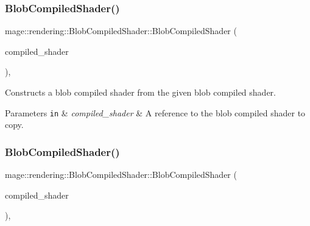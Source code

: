 \subsubsection{\texorpdfstring{Blob\+Compiled\+Shader()}{BlobCompiledShader()}\hspace{0.1cm}{\footnotesize\ttfamily [2/3]}}
{\footnotesize\ttfamily mage\+::rendering\+::\+Blob\+Compiled\+Shader\+::\+Blob\+Compiled\+Shader (\begin{DoxyParamCaption}\item[{const \mbox{\hyperlink{classmage_1_1rendering_1_1_blob_compiled_shader}{Blob\+Compiled\+Shader}} \&}]{compiled\+\_\+shader }\end{DoxyParamCaption})\hspace{0.3cm}{\ttfamily [default]}, {\ttfamily [noexcept]}}

Constructs a blob compiled shader from the given blob compiled shader.


\begin{DoxyParams}[1]{Parameters}
\mbox{\tt in}  & {\em compiled\+\_\+shader} & A reference to the blob compiled shader to copy. \\
\hline
\end{DoxyParams}
\mbox{\label{classmage_1_1rendering_1_1_blob_compiled_shader_afa58cbbad81febc6c2470f6f1b0de2ce}} 
\subsubsection{\texorpdfstring{Blob\+Compiled\+Shader()}{BlobCompiledShader()}\hspace{0.1cm}{\footnotesize\ttfamily [3/3]}}
{\footnotesize\ttfamily mage\+::rendering\+::\+Blob\+Compiled\+Shader\+::\+Blob\+Compiled\+Shader (\begin{DoxyParamCaption}\item[{\mbox{\hyperlink{classmage_1_1rendering_1_1_blob_compiled_shader}{Blob\+Compiled\+Shader}} \&\&}]{compiled\+\_\+shader }\end{DoxyParamCaption})\hspace{0.3cm}{\ttfamily [default]}, {\ttfamily [noexcept]}}

